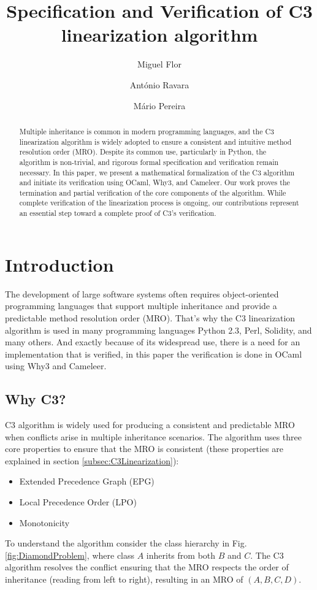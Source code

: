 \documentclass[runningheads]{llncs}
\title{Specification and Verification of C3 linearization algorithm}
\author{
  Miguel Flor\inst{1} \and António Ravara\inst{2} \and Mário Pereira\inst{2}
}
\institute{
  NOVA LINCS, Nova School of Science and Technology \\
  \email{m.flor@campus.fct.unl.pt}, \email{\{aravara, mjp.pereira\}@fct.unl.pt}
}
\begin{document}
\maketitle

\begin{abstract}
Multiple inheritance is common in modern programming languages,
 and the C3 linearization algorithm is widely adopted to ensure a consistent and intuitive method resolution order (MRO). Despite its common use, particularly in Python, the algorithm is non-trivial, and rigorous formal specification and verification remain necessary.
In this paper, we present a mathematical formalization of the C3 algorithm and initiate its verification using OCaml, Why3, and Cameleer. Our work proves the termination and partial verification of the core components of the algorithm.
While complete verification of the linearization process is ongoing, our contributions represent an essential step toward a complete proof of C3's verification.

     
\end{abstract}
\section{Introduction}
The development of large software systems often requires object-oriented programming languages that support multiple inheritance and provide a predictable method resolution order (MRO). 
 That's why the C3 linearization algorithm is used in many programming languages Python 2.3\autocite{Python23Method}, Perl\autocite{MroMethodResolution}, Solidity\autocite{LanguageInfluencesSolidity}, and many others.
 And exactly because of its widespread use, there is a need for an implementation that is verified, in this paper the verification is done in OCaml using Why3 and Cameleer.

\subsection{Why C3?}
C3 algorithm is widely used for producing a consistent and predictable MRO when conflicts arise in multiple inheritance scenarios.
The algorithm uses three core properties to ensure that the MRO is consistent (these properties are explained in section \ref{subsec:C3Linearization}):
\begin{itemize}
    \item Extended Precedence Graph (EPG)
    \item Local Precedence Order (LPO)
    \item Monotonicity
\end{itemize}
To understand the algorithm consider the class hierarchy in Fig. \ref{fig:DiamondProblem}, where class $A$ inherits from both $B$ and $C$. The C3 algorithm resolves the conflict ensuring that the MRO respects the order of inheritance (reading from left to right), resulting in an MRO of $(A, B, C, D)$.
\end{document}
